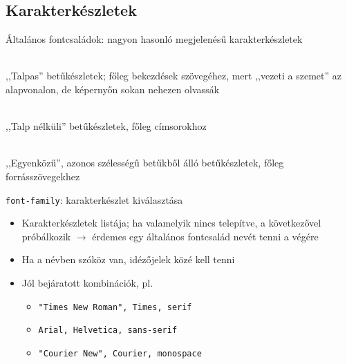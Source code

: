 \subsection{Karakterkészletek}

\begin{frame}
  Általános fontcsaládok: nagyon hasonló megjelenésű karakterkészletek
  \begin{description}[m]
    \item[Serif] \hfill \\ ,,Talpas'' betűkészletek; főleg bekezdések szövegéhez, mert ,,vezeti a szemet'' az alapvonalon, de képernyőn sokan nehezen olvassák
    \item[Sans-serif] \hfill \\ ,,Talp nélküli'' betűkészletek, 
    főleg címsorokhoz
    \item[Monospace] \hfill \\ ,,Egyenközű'', azonos szélességű 
    betűkből álló betűkészletek, főleg forrásszövegekhez
  \end{description}
\end{frame}

\begin{frame}
  \texttt{font-family}: karakterkészlet kiválasztása
  \begin{itemize}
    \item Karakterkészletek listája; 
    ha valamelyik nincs telepítve, a következővel próbálkozik 
    $\to$ érdemes egy általános fontcsalád nevét tenni a végére
    \item Ha a névben szóköz van, idézőjelek közé kell tenni
    \item Jól bejáratott kombinációk, pl.
    \begin{itemize}
      \item \texttt{"Times New Roman", Times, serif}
      \item \texttt{Arial, Helvetica, sans-serif}
      \item \texttt{"Courier New", Courier, monospace}
    \end{itemize}
  \end{itemize}
\end{frame}

